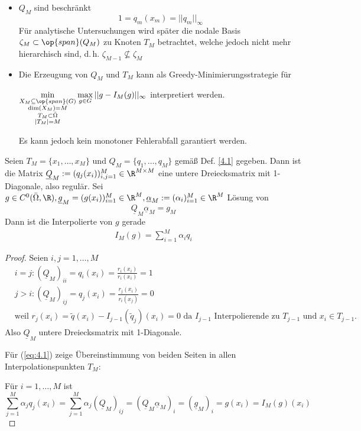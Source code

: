 \begin{bem} \beginwithlistbem
	\begin{itemize}
		\item $Q_M$ sind beschränkt
		\[
			1 = q_m(x_m) = || q_m||_{\infty}
		\]
		Für analytische Untersuchungen wird später die nodale Basis $\zeta_M \subset \op{span} (Q_M)$ zu Knoten $T_M$ betrachtet, welche jedoch nicht mehr hierarchisch sind, d.\,h. $\zeta_{M-1} \not\subseteq \zeta_M$
		\item Die Erzeugung von $Q_M$ und $T_M$ kann als Greedy-Minimierungsstrategie  für
		
		 $\min\limits_{\substack{X_M \subseteq \op{span}(G) \\ \dim(X_M) = M \\ T_M \subset \bar{\Omega} \\ |T_M| = M}} \max\limits_{g \in G} ||g - I_M (g) ||_{\infty}$ interpretiert werden.
		
		Es kann jedoch kein monotoner Fehlerabfall garantiert werden.
	\end{itemize}
\end{bem}

\begin{satz}
Seien $T_M = \{x_1,\dots,x_M\}$ und $Q_M = \{q_1,\dots,q_M\}$ gemäß Def. \ref{4.1} gegeben. Dann ist die Matrix $\underline{Q}_M := (q_j(x_i))_{i,j=1}^M \in \R^{M \times M}$ eine untere Dreiecksmatrix mit 1-Diagonale, also regulär.
Sei $g \in C^0 (\bar{\Omega},\R), \underline{g}_M = (g(x_i))_{i=1}^M \in \R^M, \underline{\alpha}_M := (\alpha_i)_{i=1}^M \in \R^M$ Lösung von
\[
	\underline{Q}_M \underline{\alpha}_M = g_M
\]
Dann ist die Interpolierte von $g$ gerade
\begin{align} \label{eq:4.1}
I_M (g) = \sum\limits_{i=1}^M \alpha_i q_i
\end{align}
\begin{proof}
Seien $i,j = 1,\dots,M$
\begin{align*}
&i=j: (\underline{Q}_M)_{ii} = q_i(x_i) = \frac{r_i(x_i)}{r_i(x_i)} = 1 \\
&j>i: (\underline{Q}_M)_{ij} = q_j(x_i) = \frac{r_j(x_i)}{r_i(x_j)} = 0 \\
&\text{weil } r_j(x_i) = \tilde{q}(x_i) - I_{j-1}(\tilde{q}_j)(x_i) = 0 \text{ da } I_{j-1} \text{ Interpolierende zu } T_{j-1} \text{ und } x_i \in T_{j-1}.
\end{align*}
Also $\underline{Q}_M$ untere Dreiecksmatrix mit 1-Diagonale.

Für (\ref{eq:4.1}) zeige Übereinstimmung von beiden Seiten in allen Interpolationspunkten $T_M$:

Für $i=1,\dots,M$ ist
\[
	\sum\limits_{j=1}^M \alpha_j q_j(x_i) = \sum\limits_{j=1}^M \alpha_j (\underline{Q}_M)_{ij} = (\underline{Q}_M \underline{\alpha}_M)_i = (\underline{g}_M)_i = g(x_i) = I_M(g)(x_i)
\]
\end{proof}
\end{satz}

